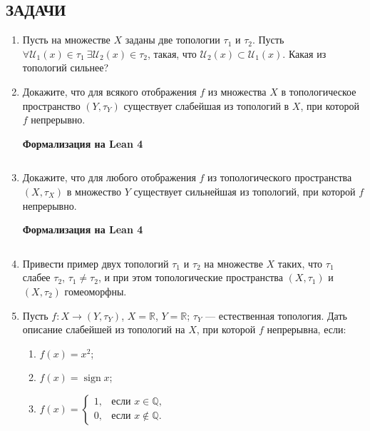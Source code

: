 \documentclass[12pt,a4paper]{article}
\begin{document}
\subsection*{ЗАДАЧИ}
\begin{enumerate}
\item Пусть на множестве $X$ заданы две топологии $\tau_{1}$ и $\tau_{2}$. Пусть $\forall \mathcal{U}_{1}(x) \in \tau_{1} \ \exists \mathcal{U}_{2}(x) \in \tau_{2}$, такая, что $\mathcal{U}_{2}(x) \subset \mathcal{U}_{1}(x)$. Какая из топологий сильнее?

\newpage
\item Докажите, что для всякого отображения $f$ из множества $X$ в топологическое пространство $(Y, \tau_{Y})$ существует слабейшая из топологий в $X$, при которой $f$ непрерывно.


\begin{center}\small\textbf{Формализация на Lean 4}\end{center}
\inputminted{lean}{FunAn/Section06_TopologicalSpaces/Task02.lean}

\newpage
\item Докажите, что для любого отображения $f$ из топологического пространства $(X, \tau_{X})$ в множество $Y$ существует сильнейшая из топологий, при которой $f$ непрерывно.


\begin{center}\small\textbf{Формализация на Lean 4}\end{center}
\inputminted{lean}{FunAn/Section06_TopologicalSpaces/Task03.lean}

\newpage

\item Привести пример двух топологий $\tau_{1}$ и $\tau_{2}$ на множестве $X$ таких, что $\tau_{1}$ слабее $\tau_{2}$, $\tau_{1} \ne \tau_{2}$, и при этом топологические пространства $(X, \tau_{1})$ и $(X, \tau_{2})$ гомеоморфны.

\item Пусть $f: X \longrightarrow (Y, \tau_{Y})$, $X=\mathbb{R}$, $Y=\mathbb{R}$; $\tau_{Y}$ — естественная топология. Дать описание слабейшей из топологий на $X$, при которой $f$ непрерывна, если:
\begin{enumerate}[label=\alph*)]
\item $f(x) = x^{2}$;
\item $f(x) = \operatorname{sign} x$;
\item $f(x) =
\begin{cases} 1, & \text{если } x\in\mathbb{Q}, \\ 0, & \text{если } x\notin\mathbb{Q}.
\end{cases}$
\end{enumerate}


\end{enumerate}
\end{document}

